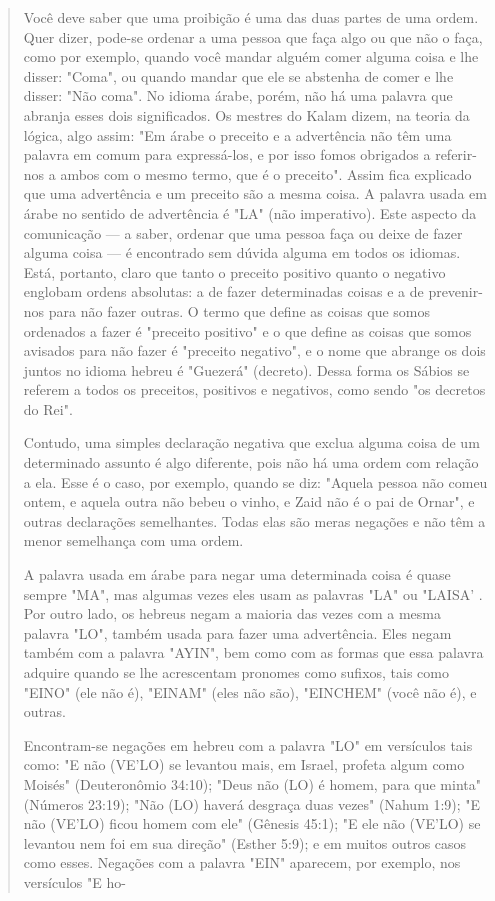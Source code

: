 \begin{quote}
Você deve saber que uma proibição é uma das duas partes de uma ordem.
Quer dizer, pode-se ordenar a uma pessoa que faça algo ou que não o
faça, como por exemplo, quando você mandar alguém comer alguma coisa e
lhe disser: "Coma", ou quando mandar que ele se abstenha de comer e lhe
disser: "Não coma". No idioma árabe, porém, não há uma palavra que
abranja esses dois significados. Os mestres do Kalam dizem, na teoria da
lógica, algo assim: "Em árabe o preceito e a advertência não têm uma
palavra em comum para expressá-los, e por isso fomos obrigados a
referir-nos a ambos com o mes­mo termo, que é o preceito". Assim fica
explicado que uma advertência e um preceito são a mesma coisa. A palavra
usada em árabe no sentido de advertên­cia é "LA" (não imperativo). Este
aspecto da comunicação --- a saber, ordenar que uma pessoa faça ou deixe
de fazer alguma coisa --- é encontrado sem dúvi­da alguma em todos os
idiomas. Está, portanto, claro que tanto o preceito posi­tivo quanto o
negativo englobam ordens absolutas: a de fazer determinadas coi­sas e a
de prevenir-nos para não fazer outras. O termo que define as coisas que
somos ordenados a fazer é "preceito positivo" e o que define as coisas
que so­mos avisados para não fazer é "preceito negativo", e o nome que
abrange os dois juntos no idioma hebreu é "Guezerá" (decreto). Dessa
forma os Sábios se referem a todos os preceitos, positivos e negativos,
como sendo "os decre­tos do Rei".

Contudo, uma simples declaração negativa que exclua alguma coisa de um
determinado assunto é algo diferente, pois não há uma ordem com rela­ção
a ela. Esse é o caso, por exemplo, quando se diz: "Aquela pessoa não
co­meu ontem, e aquela outra não bebeu o vinho, e Zaid não é o pai de
Ornar", e outras declarações semelhantes. Todas elas são meras negações
e não têm a menor semelhança com uma ordem.

A palavra usada em árabe para negar uma determinada coisa é quase sempre
"MA", mas algumas vezes eles usam as palavras "LA" ou "LAISA' . Por
outro lado, os hebreus negam a maioria das vezes com a mesma palavra
"LO", também usada para fazer uma advertência. Eles negam também com a
palavra "AYIN", bem como com as formas que essa palavra adquire quando
se lhe acres­centam pronomes como sufixos, tais como "EINO" (ele não é),
"EINAM" (eles não são), "EINCHEM" (você não é), e outras.

Encontram-se negações em hebreu com a palavra "LO" em versícu­los tais
como: "E não (VE'LO) se levantou mais, em Israel, profeta algum como
Moisés" (Deuteronômio 34:10); "Deus não (LO) é homem, para que minta"
(Nú­meros 23:19); "Não (LO) haverá desgraça duas vezes" (Nahum 1:9); "E
não (VE'LO) ficou homem com ele" (Gênesis 45:1); "E ele não (VE'LO) se
levantou nem foi em sua direção" (Esther 5:9); e em muitos outros casos
como esses. Negações com a palavra "EIN" aparecem, por exemplo, nos
versículos "E ho-


\end{quote}
